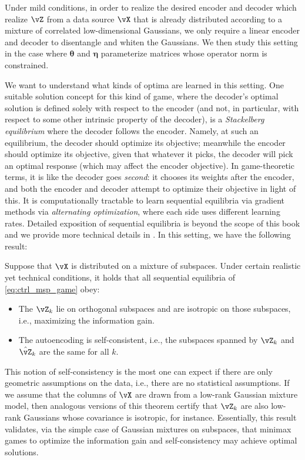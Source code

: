 \documentclass[../../book-main.tex]{subfiles}
\begin{document}
Under mild conditions, in order to realize the desired encoder and
decoder which realize \(\vZ\) from a data source \(\vX\) that is
already distributed according to a mixture of correlated
low-dimensional Gaussians, we only require a linear encoder and
decoder to disentangle and whiten the Gaussians. We then study this
setting in the case where \(\bm \theta\) and \(\bm \eta\)
parameterize matrices whose operator norm is constrained.

We want to understand what kinds of optima are learned in this
setting. One suitable solution concept for this kind of game, where
the decoder's optimal solution is defined solely with respect to the
encoder (and not, in particular, with respect to some other intrinsic
property of the decoder), is a \textit{Stackelberg equilibrium} where
the decoder follows the encoder. %
Namely, at such an equilibrium, the decoder should optimize its
objective; meanwhile the encoder should optimize its objective, given
that whatever it picks, the decoder will pick an optimal response
(which may affect the encoder objective). In game-theoretic terms, it
is like the decoder goes \textit{second}: it chooses its weights
after the encoder, and both the encoder and decoder attempt to
optimize their objective in light of this. It is computationally
tractable to learn sequential equilibria via gradient methods via
\textit{alternating optimization}, where each side uses different
learning rates. Detailed exposition of sequential equilibria is
beyond the scope of this book and we provide more technical details
in . In this setting, we have the following result:
\begin{theorem}\label{thm:ctrl_theory}
    Suppose that \(\vX\) is distributed on a mixture of subspaces.
    Under certain realistic yet technical conditions, it holds that
    all sequential equilibria of \eqref{eq:ctrl_msp_game} obey:
    \begin{itemize}
        \item The \(\vZ_{k}\) lie on orthogonal subspaces and are
            isotropic on those subspaces, i.e., maximizing the information gain.
        \item The autoencoding is self-consistent, i.e., the
            subspaces spanned by \(\vZ_{k}\) and \(\hat{\vZ}_{k}\)
            are the same for all \(k\).
    \end{itemize}
\end{theorem}
This notion of self-consistency is the most one can expect if there
are only geometric assumptions on the data, i.e., there are no
statistical assumptions. If we assume that the columns of \(\vX\) are
drawn from a low-rank Gaussian mixture model, then analogous versions
of this theorem certify that \(\vZ_{k}\) are also low-rank Gaussians
whose covariance is isotropic, for instance. %
Essentially, this result validates, via the simple case of Gaussian
mixtures on subspaces, that minimax games to optimize the information
gain and self-consistency may achieve optimal solutions.
\end{document}
